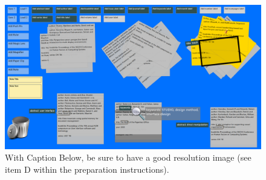 \documentclass{sigchi}
\begin{document}
\begin{figure}[!h]
\centering
\includegraphics[width=0.9\columnwidth]{HabilisScreenShot}
\caption{With Caption Below, be sure to have a good resolution image
  (see item D within the preparation instructions).}
\label{fig:figure1}
\end{figure}
\end{document}
